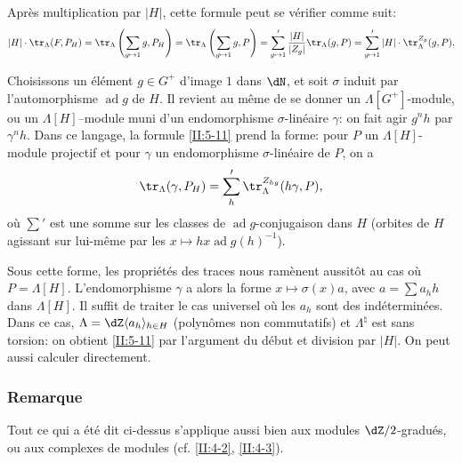 Après multiplication par $|H|$, cette formule peut se vérifier comme suit: 
\[
  |H|\cdot \tr_\Lambda(F,P_H) 
    = \tr_\Lambda\left(\sum_{g\mapsto 1} g,P_H\right) 
    = \tr_\Lambda\left(\sum_{g\mapsto 1} g,P\right) 
    = \sum_{g\mapsto 1}' \frac{|H|}{|Z_g|}\tr_\Lambda(g,P) 
    = \sum_{g\mapsto 1}' |H|\cdot \tr_\Lambda^{Z_g}(g,P) \text{.}
\]

Choisissons un élément $g\in G^+$ d'image $1$ dans $\dN$, et soit 
$\sigma$  induit par l'automorphisme 
$\operatorname{ad} g$ de $H$. Il revient au même de se donner un 
$\Lambda[G^+]$-module, ou un $\Lambda[H]$--module muni d'un endomorphisme 
$\sigma$-linéaire $\gamma$: on fait agir $g^n h$ par $\gamma^n h$. Dans ce 
langage, la formule \ref{II:5-11} prend la forme: pour $P$ un 
$\Lambda[H]$-module projectif et pour $\gamma$ un endomorphisme 
$\sigma$-linéaire de $P$, on a 
\[
  \tr_\Lambda(\gamma,P_H) = \sum_h' \tr_\Lambda^{Z_{hg}}(h\gamma,P)\text{,}
\]
où $\sum'$ est une somme sur les classes de $\operatorname{ad}g$-conjugaison 
dans $H$ (orbites de $H$ agissant sur lui-même par les 
$x\mapsto h x \operatorname{ad} g(h)^{-1}$). 

Sous cette forme, les propriétés des traces nous ramènent aussitôt au 
cas où $P=\Lambda[H]$. L'endomorphisme $\gamma$ a alors la forme 
$x\mapsto \sigma(x) a$, avec $a=\sum a_h h$ dans $\Lambda[H]$. Il suffit de 
traiter le cas universel où les $a_h$ sont des indéterminées. Dans ce 
cas, $\Lambda=\dZ\langle a_h\rangle_{h\in H}$ (polynômes non commutatifs) et 
$\Lambda^\natural$ est sans torsion: on obtient \ref{II:5-11} par l'argument 
du début et division par $|H|$. On peut aussi calculer directement. 





\subsubsection{Remarque}\label{II:5-11-1}

Tout ce qui a été dit ci-dessus s'applique aussi bien aux modules 
$\dZ/2$-gradués, ou aux complexes de modules (cf. \ref{II:4-2}, \ref{II:4-3}). 





\subsection{}\label{II:5-12}

